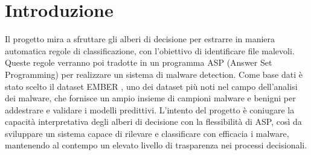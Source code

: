 \section{Introduzione}
Il progetto mira a sfruttare gli alberi di decisione per estrarre in maniera automatica regole di classificazione, con l’obiettivo di identificare file malevoli. Queste regole verranno poi tradotte in un programma ASP (Answer Set Programming) per realizzare un sistema di malware detection. Come base dati è stato scelto il dataset EMBER \cite{ember}, uno dei dataset più noti nel campo dell’analisi dei malware, che fornisce un ampio insieme di campioni malware e benigni per addestrare e validare i modelli predittivi. L’intento del progetto è coniugare la capacità interpretativa degli alberi di decisione con la flessibilità di ASP, così da sviluppare un sistema capace di rilevare e classificare con efficacia i malware, mantenendo al contempo un elevato livello di trasparenza nei processi decisionali.
